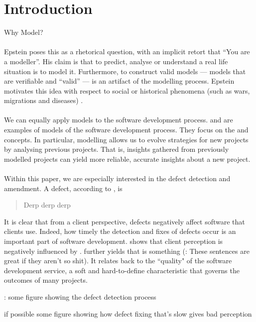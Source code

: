 \section{Introduction}

Why Model?\\
\\
Epstein poses this as a rhetorical question, with an implicit retort that “You are a modeller”. His claim is that to predict, analyse or understand a real life situation is to model it. Furthermore, to construct valid models --- models that are verifiable and “valid” --- is an artifact of the modelling process. Epstein motivates this idea with respect to social or historical phenomena (such as wars, migrations and diseases) \FIXME.\\
\\
We can equally apply models to the software development process.
\FIXME and \FIXME are examples of models of the software development process.
They focus on the \FIXME and \FIXME concepts.
In particular, modelling allows us to evolve strategies for new projects by analysing previous projects.
That is, insights gathered from previously modelled projects can yield more reliable, accurate insights about a new project.\\
\\
Within this paper, we are especially interested in the defect detection and amendment.
A defect, according to \FIXME, is
\begin{quote}
  Derp derp derp
\end{quote}

It is clear that from a client perspective, defects negatively affect software that clients use. 
Indeed, how timely the detection and fixes of defects occur is an important part of software development.
\FIXME shows that client perception is negatively influenced by \FIXME. \FIXME further yields that \FIXME is something (\FIXME: These sentences are great if they aren’t so shit).
It relates back to the ``quality" of the software development service, a soft and hard-to-define
characteristic that governs the outcomes of many projects.

\FIXME: some figure showing the defect detection process

\FIXME if possible some figure showing how defect fixing that’s slow gives bad perception

